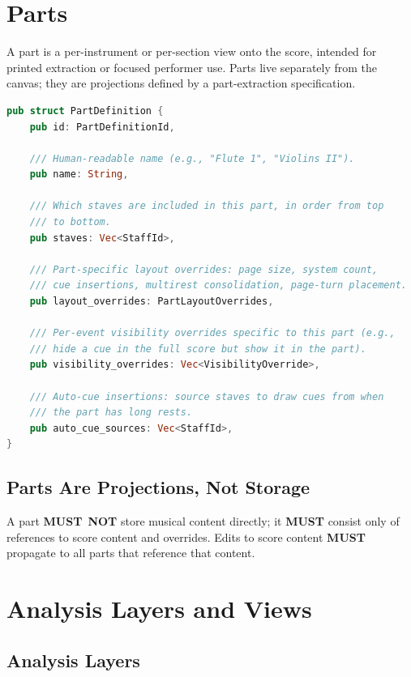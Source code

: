 \documentclass[11pt,letterpaper]{report}
\newcounter{requirement}[chapter]
\newcommand{\MUST}{\textbf{MUST}}
\newcommand{\MUSTNOT}{\textbf{MUST}\nobreak\ \textbf{NOT}}
\begin{document}
\section{Parts}
\label{sec:graph:parts}

A part is a per-instrument or per-section view onto the score,
intended for printed extraction or focused performer use. Parts live
separately from the canvas; they are projections defined by a
part-extraction specification.

\begin{lstlisting}[language=Rust]
pub struct PartDefinition {
    pub id: PartDefinitionId,

    /// Human-readable name (e.g., "Flute 1", "Violins II").
    pub name: String,

    /// Which staves are included in this part, in order from top
    /// to bottom.
    pub staves: Vec<StaffId>,

    /// Part-specific layout overrides: page size, system count,
    /// cue insertions, multirest consolidation, page-turn placement.
    pub layout_overrides: PartLayoutOverrides,

    /// Per-event visibility overrides specific to this part (e.g.,
    /// hide a cue in the full score but show it in the part).
    pub visibility_overrides: Vec<VisibilityOverride>,

    /// Auto-cue insertions: source staves to draw cues from when
    /// the part has long rests.
    pub auto_cue_sources: Vec<StaffId>,
}
\end{lstlisting}

\subsection{Parts Are Projections, Not Storage}

\begin{requirement}
  \label{req:graph:part-content-projection}
  A part \MUSTNOT{} store musical content directly; it \MUST{} consist
  only of references to score content and overrides. Edits to score
  content \MUST{} propagate to all parts that reference that content.
\end{requirement}

\section{Analysis Layers and Views}
\label{sec:graph:layers}

\subsection{Analysis Layers}
\end{document}
